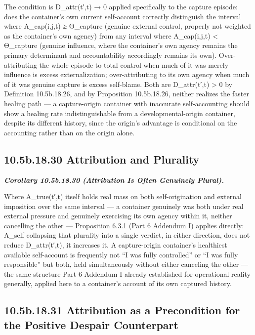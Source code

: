 \documentclass[
]{article}
\begin{document}
The condition is D\_attr(t′,t) → 0 applied specifically to the capture
episode: does the container's own current self-account correctly
distinguish the interval where A\_cap(i,j,t) ≥ Θ\_capture (genuine
external control, properly not weighted as the container's own agency)
from any interval where A\_cap(i,j,t) \textless{} Θ\_capture (genuine
influence, where the container's own agency remains the primary
determinant and accountability accordingly remains its own).
Over-attributing the whole episode to total control when much of it was
merely influence is excess externalization; over-attributing to its own
agency when much of it was genuine capture is excess self-blame. Both
are D\_attr(t′,t) \textgreater{} 0 by Definition 10.5b.18.26, and by
Proposition 10.5b.18.26, neither realizes the faster healing path --- a
capture-origin container with inaccurate self-accounting should show a
healing rate indistinguishable from a developmental-origin container,
despite its different history, since the origin's advantage is
conditional on the accounting rather than on the origin alone.

\hypertarget{b.18.30-attribution-and-plurality}{%
\subsection{10.5b.18.30 Attribution and
Plurality}\label{b.18.30-attribution-and-plurality}}

\emph{\textbf{Corollary 10.5b.18.30 (Attribution Is Often Genuinely
Plural).}}

Where A\_true(t′,t) itself holds real mass on both self-origination and
external imposition over the same interval --- a container genuinely was
both under real external pressure and genuinely exercising its own
agency within it, neither cancelling the other --- Proposition 6.3.1
(Part 6 Addendum I) applies directly: A\_self collapsing that plurality
into a single verdict, in either direction, does not reduce
D\_attr(t′,t), it increases it. A capture-origin container's healthiest
available self-account is frequently not ``I was fully controlled'' or
``I was fully responsible'' but both, held simultaneously without either
canceling the other --- the same structure Part 6 Addendum I already
established for operational reality generally, applied here to a
container's account of its own captured history.

\hypertarget{b.18.31-attribution-as-a-precondition-for-the-positive-despair-counterpart}{%
\subsection{10.5b.18.31 Attribution as a Precondition for the Positive
Despair
Counterpart}\label{b.18.31-attribution-as-a-precondition-for-the-positive-despair-counterpart}}
\end{document}
